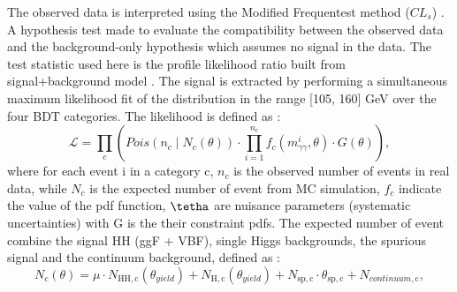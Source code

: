 The observed data is interpreted using the Modified Frequentest method ($CL_s$) \cite{CL_s}. A hypothesis test made to evaluate the compatibility between the observed data and the background-only hypothesis which assumes no signal in the data. The test statistic used here is the profile likelihood ratio \cite{Z} built from signal+background model . The signal is extracted by performing a simultaneous maximum likelihood fit of the \myy distribution in the range [105, 160] GeV over the four BDT categories. The likelihood is defined as : 
\begin{equation}
    \mathcal{L}=\prod_{c}\left(Pois\left(n_{c}
    \mid N_{c}(\theta)\right) \cdot \prod_{i=1}^{n_{c}}
    f_{c}\left(m_{\gamma \gamma}^{i}, \theta\right) \cdot G(\theta)\right),
\end{equation}
where for each event i in a category c, $n_c$ is the observed number of events in real data, while $N_c$ is the expected number of event from MC simulation, 
$f_c$ indicate the value of the pdf function, $\tetha$ are nuisance parameters (systematic uncertainties) with G is the their constraint pdfs. The expected number of event combine the signal HH (ggF + VBF), single Higgs backgrounds, the spurious signal and the continuum background, defined as : 
\begin{equation}
    N_{c}(\theta)=\mu \cdot N_{\mathrm{HH},
    \mathrm{c}}\left(\theta_{yield }\right)+N_{\mathrm{H},
    \mathrm{c}}\left(\theta_{yield }\right)+N_{\mathrm{sp},
    \mathrm{c}} \cdot \theta_{\mathrm{sp},
    \mathrm{c}}+N_{continuum , \mathrm{c}},
\end{equation}

